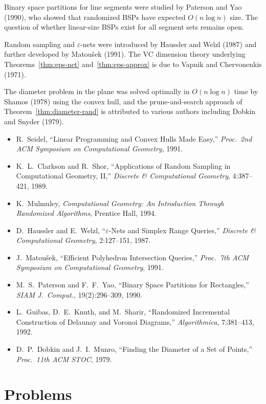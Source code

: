 \documentclass[twoside,12pt]{book}
\theoremstyle{plain}
\theoremstyle{definition}
\theoremstyle{remark}
\begin{document}
Binary space partitions for line segments were studied by Paterson and Yao (1990), who showed that randomized BSPs have expected $O(n \log n)$ size. The question of whether linear-size BSPs exist for all segment sets remains open.

Random sampling and $\varepsilon$-nets were introduced by Haussler and Welzl (1987) and further developed by Matou\v{s}ek (1991). The VC dimension theory underlying Theorems~\ref{thm:eps-net} and~\ref{thm:eps-approx} is due to Vapnik and Chervonenkis (1971).

The diameter problem in the plane was solved optimally in $O(n \log n)$ time by Shamos (1978) using the convex hull, and the prune-and-search approach of Theorem~\ref{thm:diameter-rand} is attributed to various authors including Dobkin and Snyder (1979).

\begin{itemize}[nosep]
    \item R.~Seidel, ``Linear Programming and Convex Hulls Made Easy,'' \textit{Proc.\ 2nd ACM Symposium on Computational Geometry}, 1991.
    \item K.~L.~Clarkson and R.~Shor, ``Applications of Random Sampling in Computational Geometry, II,'' \textit{Discrete \& Computational Geometry}, 4:387--421, 1989.
    \item K.~Mulmuley, \textit{Computational Geometry: An Introduction Through Randomized Algorithms}, Prentice Hall, 1994.
    \item D.~Haussler and E.~Welzl, ``$\varepsilon$-Nets and Simplex Range Queries,'' \textit{Discrete \& Computational Geometry}, 2:127--151, 1987.
    \item J.~Matou\v{s}ek, ``Efficient Polyhedron Intersection Queries,'' \textit{Proc.\ 7th ACM Symposium on Computational Geometry}, 1991.
    \item M.~S.~Paterson and F.~F.~Yao, ``Binary Space Partitions for Rectangles,'' \textit{SIAM J.\ Comput.}, 19(2):296--309, 1990.
    \item L.~Guibas, D.~E.~Knuth, and M.~Sharir, ``Randomized Incremental Construction of Delaunay and Voronoi Diagrams,'' \textit{Algorithmica}, 7:381--413, 1992.
    \item D.~P.~Dobkin and J.~I.~Munro, ``Finding the Diameter of a Set of Points,'' \textit{Proc.\ 11th ACM STOC}, 1979.
\end{itemize}

\section*{Problems}
\label{sec:problems-9}
\end{document}
